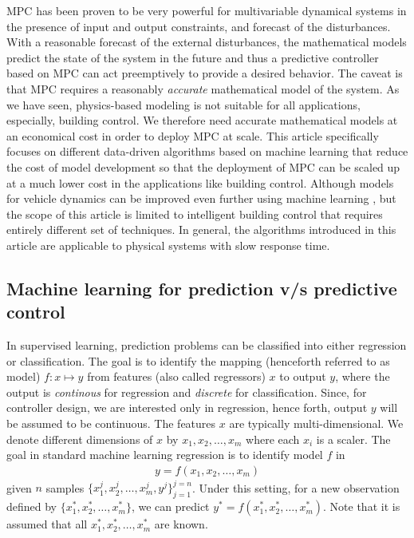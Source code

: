 MPC has been proven to be very powerful for multivariable dynamical systems in the presence of input and output constraints, and forecast of the disturbances.
With a reasonable forecast of the external disturbances, the mathematical models predict the state of the system in the future and thus a predictive controller based on MPC can act preemptively to provide a desired behavior.
The caveat is that MPC requires a reasonably \textit{accurate} mathematical model of the system.
As we have seen, physics-based modeling is not suitable for all applications, especially, building control.
We therefore need accurate mathematical models at an economical cost in order to deploy MPC at scale.
This article specifically focuses on different data-driven algorithms based on machine learning that reduce the cost of model development so that the deployment of MPC can be scaled up at a much lower cost in the applications like building control.
Although models for vehicle dynamics can be improved even further using machine learning \cite{Hewing2018}, but the scope of this article is limited to intelligent building control that requires entirely different set of techniques.
In general, the algorithms introduced in this article are applicable to physical systems with slow response time.

\subsection{Machine learning for prediction v/s predictive control}

In supervised learning, prediction problems can be classified into either regression or classification.
The goal is to identify the mapping (henceforth referred to as model) \(f: x \mapsto y\) from features (also called regressors) \(x\) to output \(y\), where the output is \textit{continous} for regression and \textit{discrete} for classification.
Since,  for controller design, we are interested only in regression, hence forth, output \(y\) will be assumed to be continuous.
The features \(x\) are typically multi-dimensional.
We denote different dimensions of \(x\) by \(x_1, x_2, \dots, x_m\) where each \(x_i\) is a scaler.
The goal in standard machine learning regression is to identify model \(f\) in
\begin{align}
y = f\left( x_1, x_2, \dots, x_m \right)
\label{E:mlmodel}
\end{align}
given \(n\) samples \(\{ x_1^j, x_2^j, \dots, x_m^j, y^j \}_{j=1}^{j=n}\).
Under this setting, for a new observation defined by \(\{ x_1^*, x_2^*, \dots, x_m^* \}\), we can predict \(y^* = f\left( x_1^*, x_2^*, \dots, x_m^* \right) \).
Note that it is assumed that all \(x_1^*, x_2^*, \dots, x_m^*\) are known.

